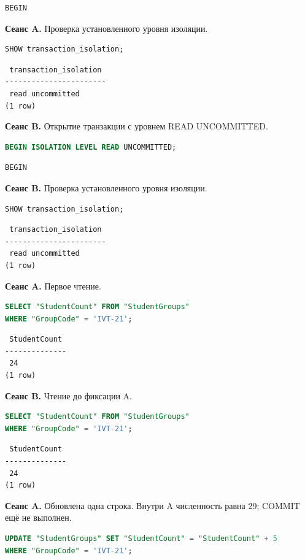 \documentclass[12pt,a4paper]{article}
\begin{document}
\begin{lstlisting}
BEGIN
\end{lstlisting}

\textbf{Сеанс A.} Проверка установленного уровня изоляции.
\begin{lstlisting}[language=SQL]
SHOW transaction_isolation;
\end{lstlisting}

\begin{lstlisting}
 transaction_isolation
-----------------------
 read uncommitted
(1 row)
\end{lstlisting}

\textbf{Сеанс B.} Открытие транзакции с уровнем READ UNCOMMITTED.
\begin{lstlisting}[language=SQL]
BEGIN ISOLATION LEVEL READ UNCOMMITTED;
\end{lstlisting}

\begin{lstlisting}
BEGIN
\end{lstlisting}

\textbf{Сеанс B.} Проверка установленного уровня изоляции.
\begin{lstlisting}[language=SQL]
SHOW transaction_isolation;
\end{lstlisting}

\begin{lstlisting}
 transaction_isolation
-----------------------
 read uncommitted
(1 row)
\end{lstlisting}

\textbf{Сеанс A.} Первое чтение.
\begin{lstlisting}[language=SQL]
SELECT "StudentCount" FROM "StudentGroups"
WHERE "GroupCode" = 'IVT-21';
\end{lstlisting}

\begin{lstlisting}
 StudentCount
--------------
 24
(1 row)
\end{lstlisting}

\textbf{Сеанс B.} Чтение до фиксации A.
\begin{lstlisting}[language=SQL]
SELECT "StudentCount" FROM "StudentGroups"
WHERE "GroupCode" = 'IVT-21';
\end{lstlisting}

\begin{lstlisting}
 StudentCount
--------------
 24
(1 row)
\end{lstlisting}

\textbf{Сеанс A.} Обновлена одна строка. Внутри A численность равна 29; COMMIT ещё не выполнен.
\begin{lstlisting}[language=SQL]
UPDATE "StudentGroups" SET "StudentCount" = "StudentCount" + 5
WHERE "GroupCode" = 'IVT-21';
\end{lstlisting}
\end{document}
